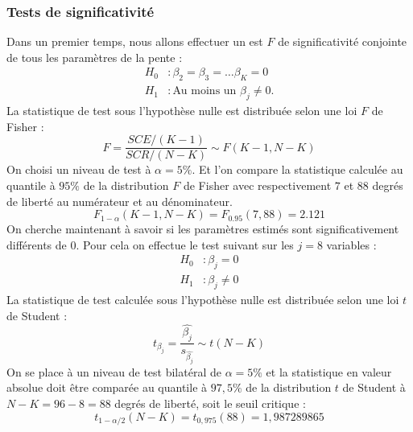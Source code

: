 \documentclass[]{article}
\begin{document}
\subsubsection{Tests de significativité}
Dans un premier temps, nous allons effectuer un est $F$ de significativité conjointe de tous les paramètres de la pente : 
\begin{equation*}
\begin{split}
    H_0 &: \beta_2 = \beta_3 = \dots \beta_K =0 \\
    H_1 &: \text{Au moins un }\beta_j \neq 0.
\end{split}
\end{equation*}
La statistique de test sous l'hypothèse nulle est distribuée selon une loi $F$ de Fisher :
\begin{equation*}
    F = \frac{SCE/(K-1)}{SCR/(N-K)} \sim F(K-1, N-K)
\end{equation*}
On choisi un niveau de test à $\alpha = 5\%$. Et l'on compare la statistique calculée au quantile à $95\%$ de la distribution $F$ de Fisher avec respectivement $7$ et $88$ degrés de liberté
au numérateur et au dénominateur. 
\begin{equation*}
    F_{1-\alpha} (K-1, N-K) = F_{0.95}(7, 88) = 2.121
\end{equation*}
On cherche maintenant à savoir si les paramètres estimés sont significativement différents de 0. Pour cela on effectue le test suivant sur les $j = 8$ variables :
\begin{equation*}
\begin{split}
    H_0 &: \beta_j =0 \\
    H_1 &: \beta_j \neq 0
\end{split}
\end{equation*}
La statistique de test calculée sous l'hypothèse nulle est distribuée selon une loi $t$ de Student : 
\begin{equation*}
    t_{\beta_j} = \frac{\hat{\beta_j}}{s_{\hat{\beta_j}}} \sim t(N-K)
\end{equation*}
On se place à un niveau de test bilatéral de $\alpha = 5\%$ et la statistique en valeur absolue doit être comparée au quantile à $97,5\%$ de la distribution $t$ de Student à $N-K = 96 - 8 = 
88$ degrés de liberté, soit le seuil critique :
\begin{equation*}
    t_{1-\alpha/2}(N-K) = t_{0,975}(88) = 1,987289865 
\end{equation*}
\end{document}
